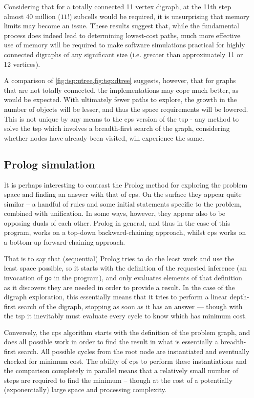 Considering that for a totally connected 11 vertex digraph, at the 11th step almost 40 million (\(11!\)) subcells would be required, it is unsurprising that memory limits may become an issue.  These results suggest that, while the fundamental process does indeed lead to determining lowest-cost paths, much more effective use of memory will be required to make software simulations practical for highly connected digraphs of any significant size (i.e. greater than approximately 11 or 12 vertices).

A comparison of \cref{fig:tsp:utree,fig:tsp:dtree} suggests, however, that for graphs that are not totally connected, the implementations may cope much better, as would be expected.  With ultimately fewer paths to explore, the growth in the number of objects will be lesser, and thus the space requirements will be lowered.  This is not unique by any means to the \gls{cps} version of the \gls{tsp} - any method to solve the \gls{tsp} which involves a breadth-first search of the graph, considering whether nodes have already been visited, will experience the same. 

\subsection{Prolog simulation}

It is perhaps interesting to contrast the Prolog method for exploring the problem space and finding an answer with that of \gls{cps}.  On the surface they appear quite similar -- a handful of rules and some initial statements specific to the problem, combined with unification.   In some ways, however, they appear also to be opposing duals of each other.  Prolog in general, and thus in the case of this program, works on a top-down backward-chaining approach, whilst \gls{cps} works on a bottom-up forward-chaining approach.

That is to say that (sequential) Prolog tries to do the least work and use the least space possible, so it starts with the definition of the requested inference (an invocation of \texttt{go} in the program), and only evaluates elements of that definition as it discovers they are needed in order to provide a result.  In the case of the digraph exploration, this essentially means that it tries to perform a linear depth-first search of the digraph, stopping as soon as it has an answer --- though with the \gls{tsp} it inevitably must evaluate every cycle to know which has minimum cost.

Conversely, the \gls{cps} algorithm starts with the definition of the problem graph, and does all possible work in order to find the result in what is essentially a breadth-first search.  All possible cycles from the root node are instantiated and eventually checked for minimum cost. The ability of \gls{cps} to perform these instantiations and the comparison completely in parallel means that a relatively small number of steps are required to find the minimum -- though at the cost of a potentially (exponentially) large space and processing complexity.

